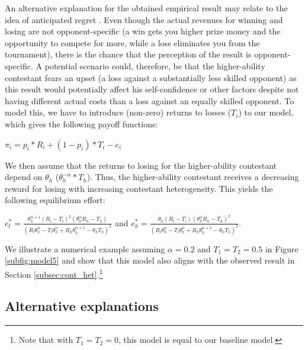 \documentclass[11pt,a4paper]{article}
\begin{document}
An alternative explanation for the obtained empirical result may relate to the idea of anticipated regret \cite{Filiz.2007, filiz.2010, Hyndman.2012}. Even though the actual revenues for winning and losing are not opponent-specific (a win gets you higher prize money and the opportunity to compete for more, while a loss eliminates you from the tournament), there is the chance that the perception of the result is opponent-specific. A potential scenario could, therefore, be that the higher-ability contestant fears an upset (a loss against a substantially less skilled opponent) as this result would potentially affect his self-confidence or other factors despite not having different actual costs than a loss against an equally skilled opponent. To model this, we have to introduce (non-zero) returns to losses ($T_i$) to our model, which gives the following payoff functions:

\begin{center}
$ \pi_i = p_i*R_i + (1-p_i)* T_i - e_i$
\end{center}

We then assume that the returns to losing for the higher-ability contestant depend on $\theta_h$ ($\theta_h^{-\alpha} * T_h$). Thus, the higher-ability contestant receives a decreasing reward for losing with increasing contestant heterogeneity. This yields the following equilibrium effort:

\begin{center}
    $e_l^* = \frac{\theta_h^{\alpha+1} (R_l-T_l)^2 (\theta_h^\alpha R_h - T_h)}{(R_l\theta_h^\alpha - T_l\theta_h^\alpha + R_h\theta_h^{\alpha+1}-\theta_h T_h)^2} $ and $e_h^* = \frac{\theta_h (R_l-T_l) (\theta_h^\alpha R_h - T_h)^2}{(R_l\theta_h^\alpha - T_l\theta_h^\alpha + R_h\theta_h^{\alpha+1}-\theta_h T_h)^2} $.
\end{center}

We illustrate a numerical example assuming $\alpha = 0.2$ and $T_1 = T_2 = 0.5$ in Figure \ref{subfig:model5} and show that this model also aligns with the observed result in Section \ref{subsec:cont_het}.\footnote{Note that with $T_1 = T_2 = 0$, this model is equal to our baseline model.}

\subsection{Alternative explanations}\label{subsec:adisc}
\end{document}
